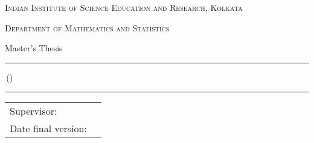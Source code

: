\begin{titlepage}
	\makeatletter
	\begin{center}
		\textsc{Indian Institute of Science Education and Research, Kolkata} %
		\par \textsc{Department of Mathematics and Statistics} %
		\par Master's Thesis \program %

		\vfill \hrule height .08em \bigskip
		\par\huge\@title\bigskip
		\par\Large\@author\,(\studentnumber)\bigskip
		\hrule height .08em\normalsize

		\vfill %
		\vfill

		\begin{tabular}{ll}
			\toprule
			Supervisor: & \supervisor\\
			Date final version: & \@date\\
			\bottomrule
		\end{tabular}

		\vfill
	\end{center}
	\makeatother
\end{titlepage}
